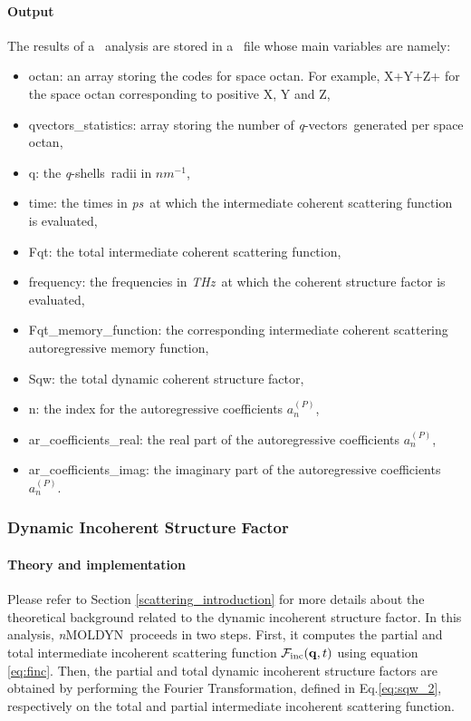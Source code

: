 \documentclass[a4paper,11pt]{report}
\newcommand{\ps}{\textit{ps}}
\newcommand{\invnm}{$nm^{-1}$}
\newcommand{\thz}{\textit{THz}}
\newcommand{\qvects}{\textit{q}-vectors}
\newcommand{\qshells}{\textit{q}-shells}
\newcommand{\NMOLDYN}{\textit{n}MOLDYN}
\begin{document}
\paragraph{Output\\}
The results of a \DCSFAR\ analysis are stored in a \NetCDF\ file whose main variables are namely:
\begin{itemize}
\item octan: an array storing the codes for space octan. For example, X+Y+Z+ for the space octan corresponding to positive
X, Y and Z,
\item qvectors\_statistics: array storing the number of \qvects\ generated per space octan,
\item q: the \qshells\ radii in \invnm ,
\item time: the times in \ps\ at which the intermediate coherent scattering function is evaluated,
\item Fqt: the total intermediate coherent scattering function,
\item frequency: the frequencies in \thz\ at which the coherent structure factor is evaluated,
\item Fqt\_memory\_function: the corresponding intermediate coherent scattering autoregressive memory function,
\item Sqw: the total dynamic coherent structure factor,
\item n: the index for the autoregressive coefficients $a_n^{(P)}$,
\item ar\_coefficients\_real: the real part of the autoregressive coefficients $a_n^{(P)}$,
\item ar\_coefficients\_imag: the imaginary part of the autoregressive coefficients $a_n^{(P)}$.
\end{itemize}

\subsubsection{Dynamic Incoherent Structure Factor}
\label{disf}
\paragraph{Theory and implementation\\}
\label{disf_theory}
Please refer to Section \ref{scattering_introduction} for more details about the theoretical background related to the dynamic 
incoherent structure factor. In this analysis, \NMOLDYN\ proceeds in two steps. First, it computes the partial and total 
intermediate incoherent scattering function ${\cal F}_{\mathrm{inc}}({\bf q},t)$ using equation \ref{eq:finc}. Then, the partial 
and total dynamic incoherent structure factors are obtained by performing the Fourier Transformation, defined 
in Eq.\ref{eq:sqw_2}, respectively on the total and partial intermediate incoherent scattering function.
\end{document}

